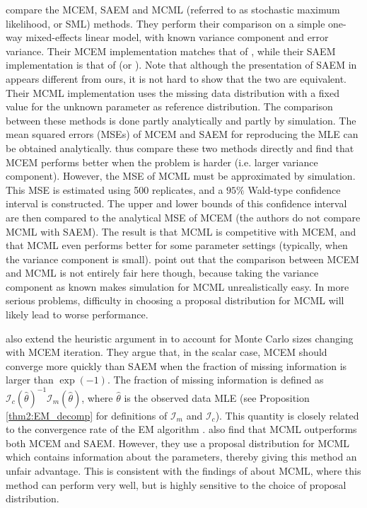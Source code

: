 \documentclass[11pt, oneside]{article}   	%
\begin{document}
\citet{Boo01} compare the MCEM, SAEM and MCML (referred to as stochastic maximum likelihood, or SML) methods. They perform their comparison on a simple one-way mixed-effects linear model, with known variance component and error variance. Their MCEM implementation matches that of \citet{Boo99}, while their SAEM implementation is that of \citet{Jan06} (or \citealp{Del99}). Note that although the presentation of SAEM in \citeauthor{Boo01} appears different from ours, it is not hard to show that the two are equivalent. Their MCML implementation uses the missing data distribution with a fixed value for the unknown parameter as reference distribution. The comparison between these methods is done partly analytically and partly by simulation. The mean squared errors (MSEs) of MCEM and SAEM for reproducing the MLE can be obtained analytically. \citeauthor{Boo01} thus compare these two methods directly and find that MCEM performs better when the problem is harder (i.e. larger variance component). However, the MSE of MCML must be approximated by simulation. This MSE is estimated using 500 replicates, and a $95\%$ Wald-type confidence interval is constructed. The upper and lower bounds of this confidence interval are then compared to the analytical MSE of MCEM (the authors do not compare MCML with SAEM). The result is that MCML is competitive with MCEM, and that MCML even performs better for some parameter settings (typically, when the variance component is small). \citeauthor{Boo01} point out that the comparison between MCEM and MCML is not entirely fair here though, because taking the variance component as known makes simulation for MCML unrealistically easy. In more serious problems, difficulty in choosing a proposal distribution for MCML will likely lead to worse performance.


\citet{Boo01} also extend the heuristic argument in \citet{Gu98I} to account for Monte Carlo sizes changing with MCEM iteration. They argue that, in the scalar case, MCEM should converge more quickly than SAEM when the fraction of missing information is larger than $\exp(-1)$. The fraction of missing information is defined as $\mathcal{I}_c(\hat{\theta})^{-1} \mathcal{I}_m(\hat{\theta})$, where $\hat{\theta}$ is the observed data MLE (see Proposition \ref{thm2:EM_decomp} for definitions of $\mathcal{I}_m$ and $\mathcal{I}_c$). This quantity is closely related to the convergence rate of the EM algorithm \citep{Men94,McL08}. \citeauthor{Boo01} also find that MCML outperforms both MCEM and SAEM. However, they use a proposal distribution for MCML which contains information about the parameters, thereby giving this method an unfair advantage. This is consistent with the findings of \citet{McC97} about MCML, where this method can perform very well, but is highly sensitive to the choice of proposal distribution.
\end{document}
